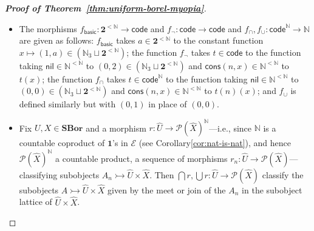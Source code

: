 \documentclass[11pt]{amsart}
\newcommand\basic{\mathsf{basic}}
\newcommand\cE{\mathcal{E}}
\newcommand\code{\mathsf{code}}
\newcommand\cons{\mathsf{cons}}
\newcommand{\N}{\mathbb{N}}
\newcommand\nil{\mathsf{nil}}
\newcommand\pow{\mathcal{P}}
\newcommand\SBor{\mathbf{SBor}}
\newcommand\tm{\mathbf{1}}
\newcommand\tto{\rightarrowtail}
\newcommand\two{\mathbf{2}}
\newcommand\wh[1]{\widehat{#1}}
\newcommand\yon{\!\text{\usefont{U}{min}{m}{n}\symbol{'210}}\!}
\theoremstyle{definition}
\theoremstyle{remark}
\theoremstyle{plain}
\begin{document}
\begin{proof}[\textbf{\textup{Proof of Theorem~\ref{thm:uniform-borel-myopia}}}]
\begin{itemize}
  Using that \( \yon \) also preserves exponentials by countable spaces (see Proposition~\ref{propn:sbor-lims-colims}), we conclude that the interpretation of the sort \( \code \) in \( \cE \) is representable, namely by the space \( \code = (\N_3 + \two^{<\N})^{\N^{<\N}} \in \SBor \); and the interpretation of \( \code^\N \) is likewise representable.
\item The morphisms \( f_{\basic} \colon \two^{<\N} \to \code \) and \( f_\neg \colon \code \to \code \) and \( f_\cap, f_\cup \colon \code^\N \to \N \) are given as follows:
  \( f_{\basic} \) takes \( a \in \two^{<\N} \) to the constant function \( x \mapsto (1, a) \in (\N_3 \sqcup \two^{<\N}) \); the function \( f_\neg \) takes \( t \in \code \) to the function taking \( \nil \in \N^{<\N} \) to \( (0, 2) \in (\N_3 \sqcup \two^{<\N}) \) and \( \cons(n, x) \in \N^{<\N} \) to \( t(x) \); the function \( f_\cap \) takes \( t \in \code^\N \) to the function taking \( \nil \in \N^{<\N} \) to \( (0, 0) \in (\N_3 \sqcup \two^{<\N}) \) and \( \cons(n, x) \in \N^{<\N} \) to \( t(n)(x) \); and \( f_\cup \) is defined similarly but with \( (0, 1) \) in place of \( (0, 0) \).
\item Fix \( U,X \in \SBor \) and a morphism \( r \colon \wh U \to \pow(\wh X)^\N \)---i.e., since \( \N \) is a countable coproduct of \( \tm \)'s in \( \cE \) (see Corollary\ref{cor:nat-is-nat}), and hence \( \pow(\wh X)^\N \) a countable product, a sequence of morphisms \( r_n \colon \wh U \to \pow(\wh X) \)---classifying subobjects \( A_n \tto \wh U \times \wh X \).
  Then \( \bigcap r, \bigcup r \colon \wh U \to \pow(\wh X) \) classify the subobjects \( A \tto \wh U \times \wh X \) given by the meet or join of the \( A_n \) in the subobject lattice of \( \wh U \times \wh X \).


\end{itemize}
\end{proof}
\end{document}
